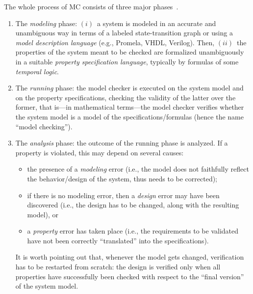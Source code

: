 The whole process of MC consists of three major phases~\cite{Baier2008}.
\begin{enumerate}
    \item The \emph{modeling} phase: $(i)$~a system is modeled in an accurate and unambiguous way in terms of  a labeled state-transition graph or using a \emph{model description language} (e.g., Promela, VHDL, Verilog). Then, $(ii)$~the properties of the system meant to be checked are formalized unambiguously in a suitable \emph{property specification language}, typically by formulas of some \emph{temporal logic}. 
    \item The \emph{running} phase: the model checker is executed on the system model and on the property specifications, checking the validity of the latter over the former, that is---in mathematical terms---the model checker verifies whether the system model is a model of the specifications/formulas (hence the name ``model checking'').
    \item The \emph{analysis} phase: the outcome of the running phase is analyzed. If a property is violated, this may depend on several causes:
    \begin{itemize}
        \item the presence of a \emph{modeling} error (i.e., the model does not faithfully reflect the behavior/design of the system, thus needs to be corrected);
        \item if there is no modeling error, then a \emph{design} error may have been discovered (i.e., the design has to be changed, along with the resulting model), or
        \item a \emph{property} error has taken place (i.e., the requirements to be validated have not been correctly ``translated'' into the specifications).
    \end{itemize}
    It is worth pointing out that, whenever the model gets changed, verification has to be restarted from scratch: the design is verified only when all properties have successfully been checked with respect to the ``final version'' of the system model.
\end{enumerate}

